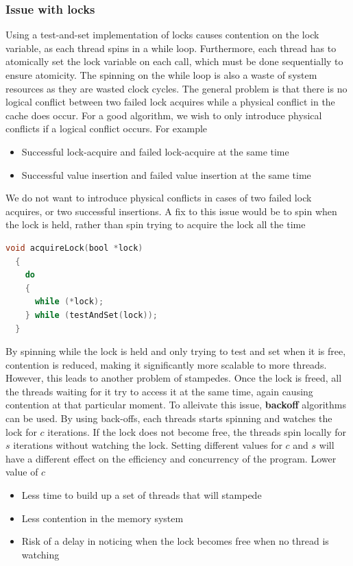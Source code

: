 \documentclass[CS4204-Notes.tex]{subfiles}
\begin{document}
\subsubsection{Issue with locks}
Using a test-and-set implementation of locks causes contention on the lock variable, as each thread spins in a while loop. Furthermore, each thread has to atomically set the lock variable on each call, which must be done sequentially to ensure atomicity. The spinning on the while loop is also a waste of system resources as they are wasted clock cycles.
\n
The general problem is that there is no logical conflict between two failed lock acquires while a physical conflict in the cache does occur. For a good algorithm, we wish to only introduce physical conflicts if a logical conflict occurs. For example
\begin{itemize}
\item Successful lock-acquire and failed lock-acquire at the same time
\item Successful value insertion and failed value insertion at the same time
\end{itemize}
We do not want to introduce physical conflicts in cases of two failed lock acquires, or two successful insertions. A fix to this issue would be to spin when the lock is held, rather than spin trying to acquire the lock all the time
\begin{lstlisting}[caption={Spin while the lock is held to reduce contention}, language=C]
  void acquireLock(bool *lock)
  {
    do
    {
      while (*lock);
    } while (testAndSet(lock));
  }
\end{lstlisting}
By spinning while the lock is held and only trying to test and set when it is free, contention is reduced, making it significantly more scalable to more threads. However, this leads to another problem of stampedes. Once the lock is freed, all the threads waiting for it try to access it at the same time, again causing contention at that particular moment. To alleivate this issue, \textbf{backoff} algorithms can be used.
\n
By using back-offs, each threads starts spinning and watches the lock for $c$ iterations. If the lock does not become free, the threads spin locally for $s$ iterations without watching the lock. Setting different values for $c$ and $s$ will have a different effect on the efficiency and concurrency of the program.
\n
Lower value of $c$
\begin{itemize}
\item Less time to build up a set of threads that will stampede
\item Less contention in the memory system
\item Risk of a delay in noticing when the lock becomes free when no thread is watching
\end{itemize}
\end{document}
